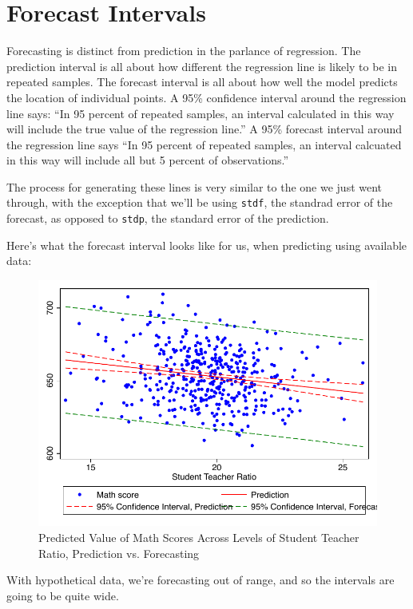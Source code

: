 \documentclass[12pt]{article}
\begin{document}
\section{Forecast Intervals}
\label{sec:forecast-intervals}

Forecasting is distinct from prediction in the parlance of
regression. The prediction interval is all about how different the
regression line is likely to be in repeated samples. The forecast
interval is all about how well the model predicts the location of
individual points. A 95\% confidence interval around the regression
line says: ``In 95 percent of repeated samples, an interval calculated
in this way will include the true value of the regression line.'' A
95\% forecast interval around the regression line says ``In 95 percent
of repeated samples, an interval calcuated in this way will include
all but 5 percent of observations.'' 

The process for generating these lines is very similar to the one we
just went through, with the exception that we'll be using
\texttt{stdf}, the standrad error of the forecast, as opposed to
\texttt{stdp}, the standard error of the prediction. 

Here's what the forecast interval looks like for us, when predicting
using available data:


\begin{figure}
  \centering
  \caption{Predicted Value of Math Scores Across Levels
    of Student Teacher Ratio, Prediction vs. Forecasting}
\includegraphics{predictvforecast}
\end{figure}

With hypothetical data, we're forecasting out of range, and so the
intervals are going to be quite wide. 
\end{document}
